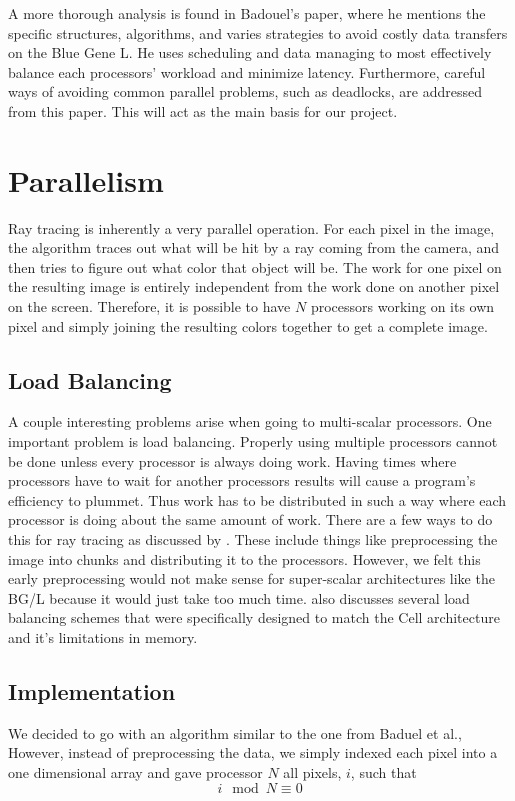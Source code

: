 \documentclass{acmsiggraph}
\begin{document}
A more thorough analysis is found in Badouel's paper, where he mentions the
specific structures, algorithms, and varies strategies to avoid costly data
transfers on the Blue Gene L.  He uses scheduling and data managing to most
effectively balance each processors' workload and minimize latency.  Furthermore,
careful ways of avoiding common parallel problems, such as deadlocks, are
addressed from this paper.  This will act as the main basis for our project. 
\cite{badouel1994dda}


\section{Parallelism}
Ray tracing is inherently a very parallel operation. For each pixel in the
image, the algorithm traces out what will be hit by a ray coming from the
camera, and then tries to figure out what color that object will be. The work
for one pixel on the resulting image is entirely independent from the work done
on another pixel on the screen. Therefore, it is possible to have $N$ processors
working on its own pixel and simply joining the resulting colors together to get
a complete image. 


\subsection{Load Balancing}
A couple interesting problems arise when going to multi-scalar processors. One
important problem is load balancing. Properly using multiple processors cannot
be done unless every processor is always doing work.  Having times where
processors have to wait for another processors results will cause a program's
efficiency to plummet. Thus work has to be distributed in such a way where each
processor is doing about the same amount of work. There are a few ways to do
this for ray tracing as discussed by \cite{badouel1994dda}. These include things
like preprocessing the image into chunks and distributing it to the processors.
However, we felt this early preprocessing would not make sense for super-scalar
architectures like the BG/L because it would just take too much time.
\cite{benthin2006rtc} also discusses several load balancing schemes that were
specifically designed to match the Cell architecture and it's limitations in
memory.


\subsection{Implementation}
We decided to go with an algorithm similar to the one from Baduel et
al., However, instead of preprocessing the data, we simply indexed each pixel
into a one dimensional array and gave processor $N$ all pixels, $i$, such that
\begin{equation}
i \mod{N} \equiv 0
\end{equation}
\end{document}
